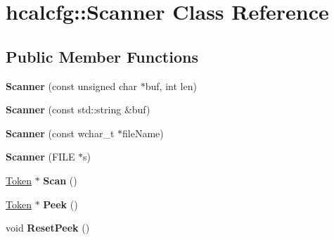 \hypertarget{classhcalcfg_1_1Scanner}{\section{hcalcfg\-:\-:Scanner Class Reference}
\label{classhcalcfg_1_1Scanner}
}
\subsection*{Public Member Functions}
\begin{DoxyCompactItemize}
\item 
\hypertarget{classhcalcfg_1_1Scanner_a5519d0ca9662ab4778a8c2b1142df7df}{{\bfseries Scanner} (const unsigned char $\ast$buf, int len)}\label{classhcalcfg_1_1Scanner_a5519d0ca9662ab4778a8c2b1142df7df}

\item 
\hypertarget{classhcalcfg_1_1Scanner_ad6e36e60912f31684631d2fdcaf40b76}{{\bfseries Scanner} (const std\-::string \&buf)}\label{classhcalcfg_1_1Scanner_ad6e36e60912f31684631d2fdcaf40b76}

\item 
\hypertarget{classhcalcfg_1_1Scanner_a0c6ec3e4eb5a8fc5c4bd5c172073635b}{{\bfseries Scanner} (const wchar\-\_\-t $\ast$file\-Name)}\label{classhcalcfg_1_1Scanner_a0c6ec3e4eb5a8fc5c4bd5c172073635b}

\item 
\hypertarget{classhcalcfg_1_1Scanner_aab557193671f865d912974168e16ea58}{{\bfseries Scanner} (F\-I\-L\-E $\ast$s)}\label{classhcalcfg_1_1Scanner_aab557193671f865d912974168e16ea58}

\item 
\hypertarget{classhcalcfg_1_1Scanner_a0af963b6991583bb67b7b4654768bd7e}{\hyperlink{classhcalcfg_1_1Token}{Token} $\ast$ {\bfseries Scan} ()}\label{classhcalcfg_1_1Scanner_a0af963b6991583bb67b7b4654768bd7e}

\item 
\hypertarget{classhcalcfg_1_1Scanner_a2815889ab2d15b29ceba7ebf22d44142}{\hyperlink{classhcalcfg_1_1Token}{Token} $\ast$ {\bfseries Peek} ()}\label{classhcalcfg_1_1Scanner_a2815889ab2d15b29ceba7ebf22d44142}

\item 
\hypertarget{classhcalcfg_1_1Scanner_aee19d11eb50ba7d0c1cd9af6cc7d445a}{void {\bfseries Reset\-Peek} ()}\label{classhcalcfg_1_1Scanner_aee19d11eb50ba7d0c1cd9af6cc7d445a}

\end{DoxyCompactItemize}
